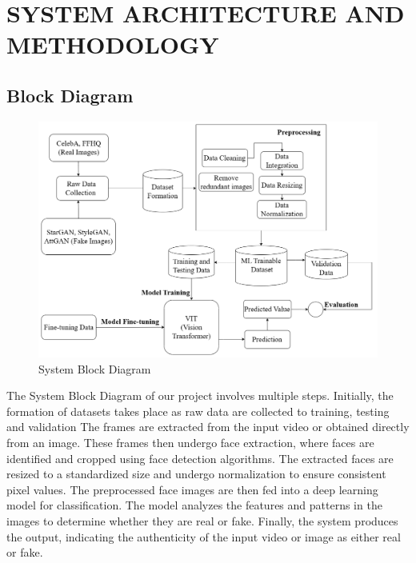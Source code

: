 \section{SYSTEM ARCHITECTURE AND METHODOLOGY }
\subsection{Block Diagram}
\begin{figure}[h]
    \centering
    \includegraphics[width= 6.5in ]{img/Model_Architecture.drawio (5).png}
    \caption{{System Block Diagram}}

\end{figure}
\justify
The System Block Diagram of our project involves multiple steps. Initially, the formation of datasets takes place as raw data are collected to training, testing and validation  The frames are extracted from the input video or obtained directly from an image. These frames then undergo face extraction, where faces are identified and cropped using face detection algorithms. The extracted faces are resized to a standardized size and undergo normalization to ensure consistent pixel values. The preprocessed face images are then fed into a deep learning model for classification. The model analyzes the features and patterns in the images to determine whether they are real or fake. Finally, the system produces the output, indicating the authenticity of the input video or image as either real or fake.
